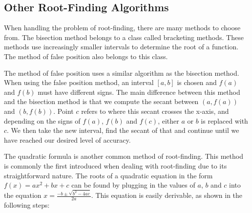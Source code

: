 \documentclass{article}
\begin{document}
\subsection{Other Root-Finding Algorithms}
When handling the problem of root-finding, there are many methods to choose from. The bisection method belongs to a class called bracketing methods. These methods use increasingly smaller intervals to determine the root of a function.\cite{vlad} The method of false position also belongs to this class. 
\par The method of false position uses a similar algorithm as the bisection method. When using the false position method, an interval $[a,b]$ is chosen and $f(a)$ and $f(b)$ must have different signs. The main difference between this method and the bisection method is that we compute the secant between $(a, f(a))$ and $(b, f(b))$. Point $c$ refers to where this secant crosses the x-axis, and depending on the signs of $f(a)$, $f(b)$ and $f(c)$, either $a$ or $b$ is replaced with $c$. We then take the new interval, find the secant of that and continue until we have reached our desired level of accuracy.
\par The quadratic formula is another common method of root-finding. This method is commonly the first introduced when dealing with root-finding due to its straightforward nature. The roots of a quadratic equation in the form $f(x)=ax^2+bx+c$ can be found by plugging in the values of $a$, $b$ and $c$ into the equation $x=\frac{-b\pm\sqrt{b^2-4ac}}{2a}$. This equation is easily derivable, as shown in the following steps:
\end{document}
